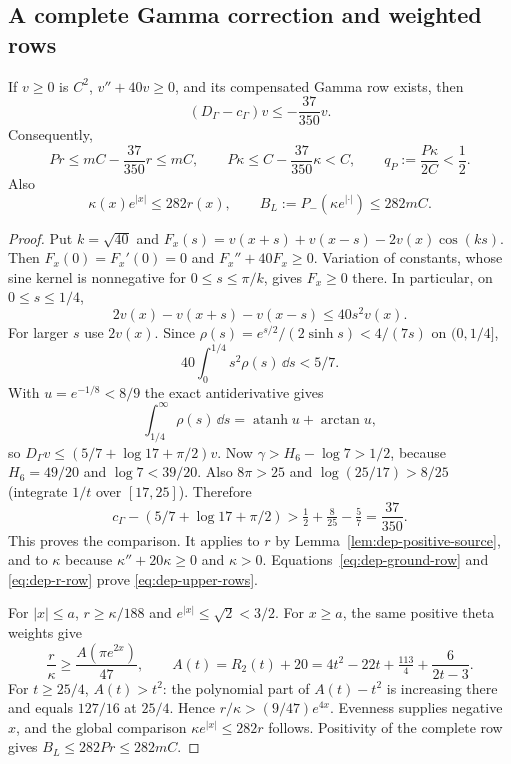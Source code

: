 \subsection{A complete Gamma correction and weighted rows}
\begin{lemma}\label{lem:dep-gamma-correction}
If $v\ge0$ is $C^2$, $v''+40v\ge0$, and its compensated Gamma row exists,
then
\[
 (D_\Gamma-c_\Gamma)v\le-\frac{37}{350}v.
\]
Consequently,
\begin{equation}\label{eq:dep-upper-rows}
 Pr\le mC-\frac{37}{350}r\le mC,\qquad
 P\kappa\le C-\frac{37}{350}\kappa<C,
 \qquad q_P:=\frac{P\kappa}{2C}<\frac12.
\end{equation}
Also
\begin{equation}\label{eq:dep-weighted-source}
 \kappa(x)e^{|x|}\le282r(x),\qquad
 B_L:=P_-(\kappa e^{|\cdot|})\le282mC.
\end{equation}
\end{lemma}
\begin{proof}
Put $k=\sqrt{40}$ and
$F_x(s)=v(x+s)+v(x-s)-2v(x)\cos(ks)$.
Then $F_x(0)=F_x'(0)=0$ and $F_x''+40F_x\ge0$.
Variation of constants, whose sine kernel is nonnegative for
$0\le s\le\pi/k$, gives $F_x\ge0$ there. In particular, on
$0\le s\le1/4$,
\[
 2v(x)-v(x+s)-v(x-s)\le40s^2v(x).
\]
For larger $s$ use $2v(x)$. Since
$\rho(s)=e^{s/2}/(2\sinh s)<4/(7s)$ on $(0,1/4]$,
\[
 40\int_0^{1/4}s^2\rho(s)\,\dd s<5/7.
\]
With $u=e^{-1/8}<8/9$ the exact antiderivative gives
\[
 \int_{1/4}^\infty\rho(s)\,\dd s=\operatorname{atanh}u+\arctan u,
\]
so $D_\Gamma v\le(5/7+\log17+\pi/2)v$.
Now $\gamma>H_6-\log7>1/2$, because $H_6=49/20$ and
$\log7<39/20$. Also $8\pi>25$ and
$\log(25/17)>8/25$ (integrate $1/t$ over $[17,25]$).
Therefore
\[
 c_\Gamma-(5/7+\log17+\pi/2)
 >\tfrac12+\tfrac8{25}-\tfrac57=\frac{37}{350}.
\]
This proves the comparison. It applies to $r$ by
Lemma~\ref{lem:dep-positive-source}, and to $\kappa$ because
$\kappa''+20\kappa\ge0$ and $\kappa>0$.
Equations~\eqref{eq:dep-ground-row} and \eqref{eq:dep-r-row}
prove \eqref{eq:dep-upper-rows}.

For $|x|\le a$, $r\ge\kappa/188$ and $e^{|x|}\le\sqrt2<3/2$.
For $x\ge a$, the same positive theta weights give
\[
 \frac r\kappa\ge\frac{A(\pi e^{2x})}{47},\qquad
 A(t)=R_2(t)+20=4t^2-22t+\tfrac{113}{4}+\frac6{2t-3}.
\]
For $t\ge25/4$, $A(t)>t^2$: the polynomial part of
$A(t)-t^2$ is increasing there and equals $127/16$ at $25/4$.
Hence $r/\kappa>(9/47)e^{4x}$.
Evenness supplies negative $x$, and the global comparison
$\kappa e^{|x|}\le282r$ follows. Positivity of the complete row gives
$B_L\le282Pr\le282mC$.
\end{proof}


